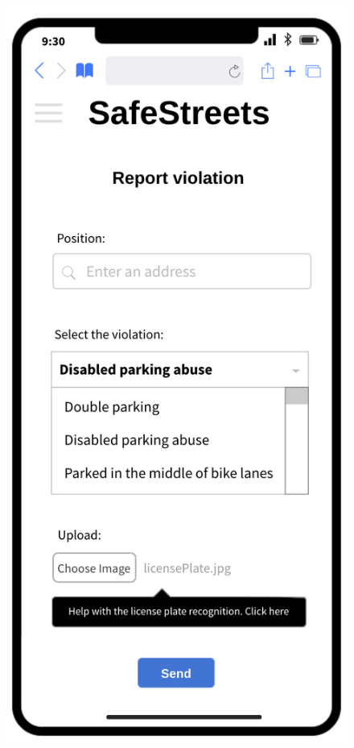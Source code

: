 		\begin{figure}[H]
		\centering
		\begin{minipage}[b]{0.40\textwidth}
			\includegraphics[width=\textwidth]{Images/report.png}

\end{minipage}
\end{figure}

